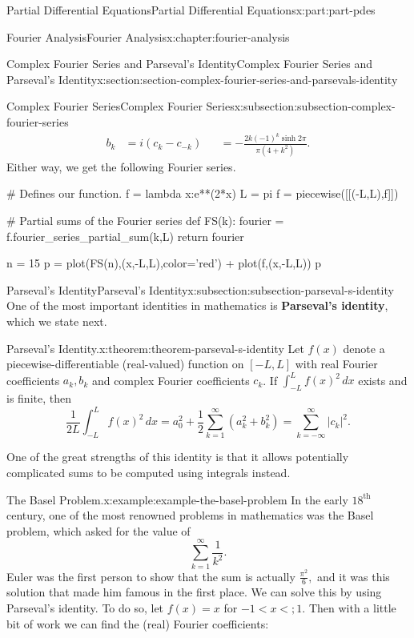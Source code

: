 \documentclass[twoside,10pt,]{book}
\newcommand{\terminology}[1]{\textbf{#1}}
\numberwithin{equation}{part}
\newcommand{\lt}{<}
\newcommand{\amp}{&}
\begin{document}
\begin{partptx}{Partial Differential Equations}{}{Partial Differential Equations}{}{}{x:part:part-pdes}
\begin{chapterptx}{Fourier Analysis}{}{Fourier Analysis}{}{}{x:chapter:fourier-analysis}
\begin{sectionptx}{Complex Fourier Series and Parseval's Identity}{}{Complex Fourier Series and Parseval's Identity}{}{}{x:section:section-complex-fourier-series-and-parsevals-identity}
\begin{subsectionptx}{Complex Fourier Series}{}{Complex Fourier Series}{}{}{x:subsection:subsection-complex-fourier-series}
\begin{align*}
b_{k} \amp = i(c_{k}-c_{-k}) \amp \amp= -\frac{2k(-1)^{k}\sinh2\pi}{\pi(4+k^{2})}. 
\end{align*}
Either way, we get the following Fourier series.%
\begin{sageinput}
# Defines our function.
f = lambda x:e**(2*x)
L = pi
f = piecewise([[(-L,L),f]])

# Partial sums of the Fourier series
def FS(k):
  fourier = f.fourier_series_partial_sum(k,L)
  return fourier

n = 15
p = plot(FS(n),(x,-L,L),color='red') + plot(f,(x,-L,L))
p
\end{sageinput}
\end{subsectionptx}
%
%
\typeout{************************************************}
\typeout{************************************************}
%
\begin{subsectionptx}{Parseval's Identity}{}{Parseval's Identity}{}{}{x:subsection:subsection-parseval-s-identity}
One of the most important identities in mathematics is \terminology{Parseval's identity}, which we state next.%
\begin{theorem}{Parseval's Identity.}{}{x:theorem:theorem-parseval-s-identity}%
%
Let \(f(x)\) denote a piecewise-differentiable (real-valued) function on \([-L,L]\) with real Fourier coefficients \(a_{k},b_{k}\) and complex Fourier coefficients \(c_{k}\). If \(\int_{-L}^{L}f(x)^{2}\,dx\) exists and is finite, then%
\begin{equation*}
\frac{1}{2L}\int_{-L}^{L}f(x)^{2}\,dx = a^{2}_{0} + \frac{1}{2}\sum_{k=1}^{\infty}(a^{2}_{k}+b^{2}_{k}) = \sum_{k=-\infty}^{\infty}|c_{k}|^{2}.
\end{equation*}
%
\end{theorem}
One of the great strengths of this identity is that it allows potentially complicated sums to be computed using integrals instead.%
\begin{example}{The Basel Problem.}{x:example:example-the-basel-problem}%
%
In the early \(18^{\text{th}}\) century, one of the most renowned problems in mathematics was the Basel problem, which asked for the value of%
\begin{equation*}
\sum_{k=1}^{\infty}\frac{1}{k^{2}}.
\end{equation*}
Euler was the first person to show that the sum is actually \(\frac{\pi^{2}}{6},\) and it was this solution that made him famous\footnotemark{} in the first place. We can solve this by using Parseval's identity. To do so, let \(f(x) = x\) for \(-1 \lt x \lt; 1\). Then with a little bit of work we can find the (real) Fourier coefficients:%

\end{example}
\end{subsectionptx}
\end{sectionptx}
\end{chapterptx}
\end{partptx}
\end{document}
